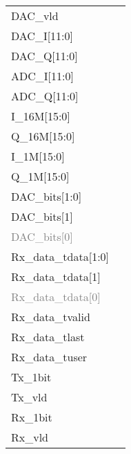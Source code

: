 \documentclass[journal,twoside]{IEEEtran}
\begin{document}
\begin{figure*}
  \setlength{\tabcolsep}{2pt}
  \sffamily\notsotiny
  \newcommand\Color{mygreen}
  \newcommand\Modulation{BPSK}%
  \newcommand\isBPSK1%
  \begin{tabularx}{\linewidth}{@{}lX@{}}
    DAC\_vld &  \\
    DAC\_I[11:0] &  \\
    DAC\_Q[11:0] &  \\
    ADC\_I[11:0] &  \\
    ADC\_Q[11:0] &  \\
    I\_16M[15:0] &  \\
    Q\_16M[15:0] &  \\
    I\_1M[15:0] &  \\
    Q\_1M[15:0] &  \\
    DAC\_bits[1:0] &  \\
    DAC\_bits[1] &  \\
    \textcolor{gray}{DAC\_bits[0]} &  \\
    Rx\_data\_tdata[1:0] &  \\
    Rx\_data\_tdata[1] &  \\
    \textcolor{gray}{Rx\_data\_tdata[0]} &  \\
    Rx\_data\_tvalid &  \\
    Rx\_data\_tlast &  \\
    Rx\_data\_tuser &  \\
    Tx\_1bit &  \\
    Tx\_vld &  \\
    Rx\_1bit &  \\
    Rx\_vld &  \\
  \end{tabularx}%
\end{figure*}
\end{document}
